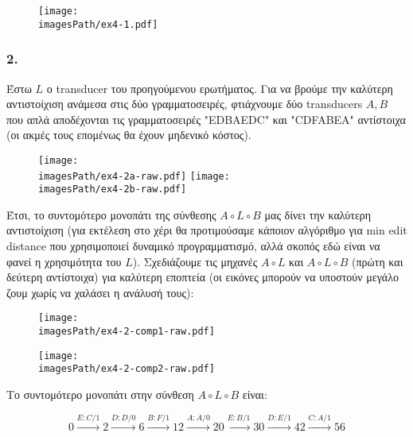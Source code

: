 \documentclass[12pt,a4paper]{article}
\newcommand{\imagesPath}{/home/nick/shmmy/8th/slp/slp-ntua/set1}
\begin{document}
			
			\begin{figure}[H]
				\begin{center}
					\texttt{[image: \\imagesPath/ex4-1.pdf]}
				\end{center}
			\end{figure}
			
		
		\subsubsection*{2.} 
			Έστω $L$ ο transducer του προηγούμενου ερωτήματος. Για να βρούμε την καλύτερη αντιστοίχιση ανάμεσα στις δύο γραμματοσειρές, φτιάχνουμε δύο transducers $A, B$ που απλά αποδέχονται τις γραμματοσειρές "EDBAEDC" και "CDFABEA" αντίστοιχα (οι ακμές τους επομένως θα έχουν μηδενικό κόστος). 
			
			\begin{figure}[H]
				\begin{center}
					\texttt{[image: \\imagesPath/ex4-2a-raw.pdf]}
					\texttt{[image: \\imagesPath/ex4-2b-raw.pdf]}
				\end{center}
			\end{figure}
			
			Έτσι, το συντομότερο μονοπάτι της σύνθεσης $A \circ L \circ B$ μας δίνει την καλύτερη αντιστοίχιση (για εκτέλεση στο χέρι θα προτιμούσαμε κάποιον αλγόριθμο για min edit distance που χρησιμοποιεί δυναμικό προγραμματισμό, αλλά σκοπός εδώ είναι να φανεί η χρησιμότητα του $L$). Σχεδιάζουμε τις μηχανές $A \circ L$ και $A \circ L \circ B$ (πρώτη και δεύτερη αντίστοιχα) για καλύτερη εποπτεία (οι εικόνες μπορούν να υποστούν μεγάλο ζουμ χωρίς να χαλάσει η ανάλυσή τους):
			
			\begin{figure}[H]
				\begin{center}
					\texttt{[image: \\imagesPath/ex4-2-comp1-raw.pdf]}
				\end{center}
			\end{figure}

			\begin{figure}[H]
				\begin{center}
					\texttt{[image: \\imagesPath/ex4-2-comp2-raw.pdf]}
				\end{center}
			\end{figure}
		
			Το συντομότερο μονοπάτι στην σύνθεση $A \circ L \circ B$ είναι:
			
			\[
				0 \xrightarrow{E:C/1} 2 \xrightarrow{D:D/0} 6 \xrightarrow{B:F/1} 12 \xrightarrow{A:A/0} 20 \xrightarrow{E:B/1} 30 \xrightarrow{D:E/1} 42 \xrightarrow{C:A/1} 56
			\]
			
\end{document}
